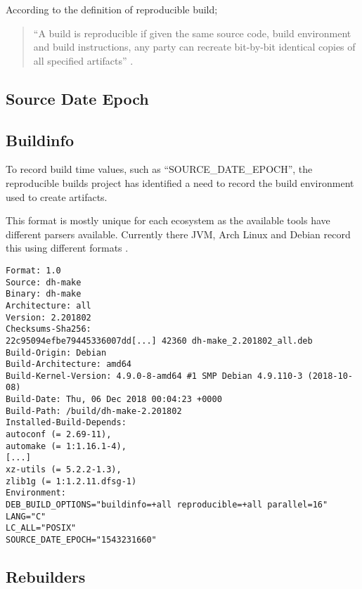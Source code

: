\documentclass[../Main/thesis.tex]{subfiles}
\begin{document}
According to the definition of reproducible build;

\begin{quotation}
``A build is reproducible if given the same source code, build environment
and build instructions, any party can recreate bit-by-bit identical copies of
all specified artifacts'' \cite{reproducible-builds-2019-definitions}.
\end{quotation}



\subsection*{Source Date Epoch}


\subsection*{Buildinfo}
To record build time values, such as ``SOURCE\_DATE\_EPOCH'', the reproducible
builds project has identified a need to record the build environment used to
create artifacts.


This format is mostly unique for each ecosystem as the available tools have
different parsers available. Currently there JVM, Arch Linux and Debian record
this using different formats \cite{reproducible-builds-2019}.

\begin{verbatim}
Format: 1.0
Source: dh-make
Binary: dh-make
Architecture: all
Version: 2.201802
Checksums-Sha256:
22c95094efbe79445336007dd[...] 42360 dh-make_2.201802_all.deb
Build-Origin: Debian
Build-Architecture: amd64
Build-Kernel-Version: 4.9.0-8-amd64 #1 SMP Debian 4.9.110-3 (2018-10-08)
Build-Date: Thu, 06 Dec 2018 00:04:23 +0000
Build-Path: /build/dh-make-2.201802
Installed-Build-Depends:
autoconf (= 2.69-11),
automake (= 1:1.16.1-4),
[...]
xz-utils (= 5.2.2-1.3),
zlib1g (= 1:1.2.11.dfsg-1)
Environment:
DEB_BUILD_OPTIONS="buildinfo=+all reproducible=+all parallel=16"
LANG="C"
LC_ALL="POSIX"
SOURCE_DATE_EPOCH="1543231660"
\end{verbatim}

\subsection*{Rebuilders}%
\end{document}
